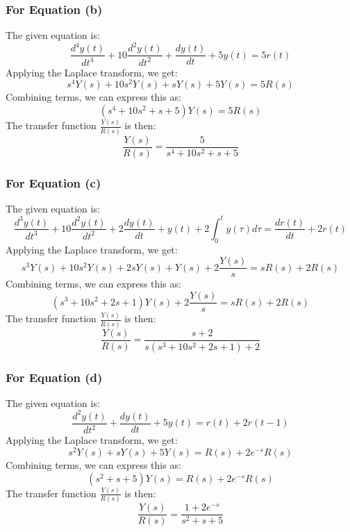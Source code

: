 \documentclass[12pt]{article}
\begin{document}
\subsubsection*{For Equation (b)}

The given equation is:
\[
\frac{d^4y(t)}{dt^4} + 10 \frac{d^2y(t)}{dt^2} + \frac{dy(t)}{dt} + 5y(t) = 5r(t)
\]
Applying the Laplace transform, we get:
\[
s^4Y(s) + 10s^2Y(s) + sY(s) + 5Y(s) = 5R(s)
\]
Combining terms, we can express this as:
\[
(s^4 + 10s^2 + s + 5)Y(s) = 5R(s)
\]
The transfer function \( \frac{Y(s)}{R(s)} \) is then:
\[
\frac{Y(s)}{R(s)} = \frac{5}{s^4 + 10s^2 + s + 5}
\]

\subsubsection*{For Equation (c)}

The given equation is:
\[
\frac{d^3y(t)}{dt^3} + 10 \frac{d^2y(t)}{dt^2} + 2 \frac{dy(t)}{dt} + y(t) + 2 \int_0^t y(\tau) d\tau = \frac{dr(t)}{dt} +2r(t)
\]
Applying the Laplace transform, we get:
\[
s^3Y(s) + 10s^2Y(s) + 2sY(s) + Y(s) + 2\frac{Y(s)}{s} = sR(s) + 2R(s)
\]
Combining terms, we can express this as:
\[
(s^3 + 10s^2 + 2s + 1)Y(s) + 2\frac{Y(s)}{s} = sR(s) + 2R(s)
\]
The transfer function \( \frac{Y(s)}{R(s)} \) is then:
\[
\frac{Y(s)}{R(s)} = \frac{s + 2}{s(s^3 + 10s^2 + 2s + 1) + 2}
\]

\subsubsection*{For Equation (d)}

The given equation is:
\[
\frac{d^2y(t)}{dt^2} + \frac{dy(t)}{dt} + 5y(t) = r(t) +2r(t-1)
\]
Applying the Laplace transform, we get:
\[
s^2Y(s) + sY(s) + 5Y(s) = R(s) + 2e^{-s}R(s)
\]
Combining terms, we can express this as:
\[
(s^2 + s + 5)Y(s) = R(s) + 2e^{-s}R(s)
\]
The transfer function \( \frac{Y(s)}{R(s)} \) is then:
\[
\frac{Y(s)}{R(s)} = \frac{1 + 2e^{-s}}{s^2 + s + 5}
\]
\end{document}
